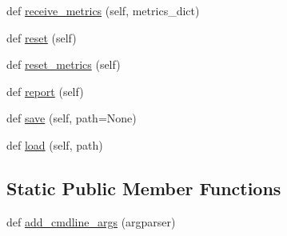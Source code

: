 \begin{DoxyCompactItemize}
\item 
def \hyperlink{classtransresnet_1_1transresnet_1_1TransresnetAgent_a13e2985e367518c17c74096581ecb807}{receive\+\_\+metrics} (self, metrics\+\_\+dict)
\item 
def \hyperlink{classtransresnet_1_1transresnet_1_1TransresnetAgent_ab8b5db45162f69898d1396eeab72e470}{reset} (self)
\item 
def \hyperlink{classtransresnet_1_1transresnet_1_1TransresnetAgent_acf24e4c4315596f9a4dc14ef044e7dba}{reset\+\_\+metrics} (self)
\item 
def \hyperlink{classtransresnet_1_1transresnet_1_1TransresnetAgent_ae3c93bd69572f26004acde7002b31f55}{report} (self)
\item 
def \hyperlink{classtransresnet_1_1transresnet_1_1TransresnetAgent_abdcd97ee679f3026758814d6c2f0d538}{save} (self, path=None)
\item 
def \hyperlink{classtransresnet_1_1transresnet_1_1TransresnetAgent_aa2fa1c344748a14803792c3bde4f4c13}{load} (self, path)
\end{DoxyCompactItemize}
\subsection*{Static Public Member Functions}
\begin{DoxyCompactItemize}
\item 
def \hyperlink{classtransresnet_1_1transresnet_1_1TransresnetAgent_ac33734d6793d57be08010cd9d4521f68}{add\+\_\+cmdline\+\_\+args} (argparser)
\end{DoxyCompactItemize}
